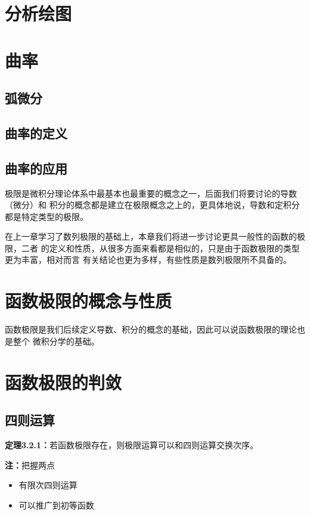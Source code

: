 \section{分析绘图}

\section{曲率}

\subsection{弧微分}

\subsection{曲率的定义}

\subsection{曲率的应用}

极限是微积分理论体系中最基本也最重要的概念之一，后面我们将要讨论的导数（微分）和
积分的概念都是建立在极限概念之上的，更具体地说，导数和定积分都是特定类型的极限。

在上一章学习了数列极限的基础上，本章我们将进一步讨论更具一般性的函数的极限，二者
的定义和性质，从很多方面来看都是相似的，只是由于函数极限的类型更为丰富，相对而言
有关结论也更为多样，有些性质是数列极限所不具备的。

\section{函数极限的概念与性质}

函数极限是我们后续定义导数、积分的概念的基础，因此可以说函数极限的理论也是整个
微积分学的基础。



\section{函数极限的判敛}

\subsection{四则运算}

{\bf 定理3.2.1：}若函数极限存在，则极限运算可以和四则运算交换次序。

{\bf 注：}把握两点
\begin{itemize}
  \setlength{\itemindent}{1cm}
  \item 有限次四则运算
  \item 可以推广到初等函数
\end{itemize}







